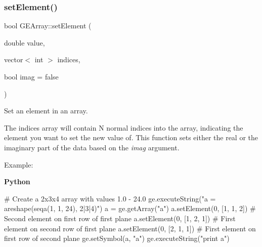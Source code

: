 \subsubsection{\texorpdfstring{set\+Element()}{setElement()}}
{\footnotesize\ttfamily bool G\+E\+Array\+::set\+Element (\begin{DoxyParamCaption}\item[{double}]{value,  }\item[{vector$<$ int $>$}]{indices,  }\item[{bool}]{imag = {\ttfamily false} }\end{DoxyParamCaption})}



Set an element in an array. 

The indices array will contain N normal indices into the array, indicating the element you want to set the new value of. This function sets either the real or the imaginary part of the data based on the {\itshape imag} argument.

Example\+:

{\bfseries Python} 
\begin{DoxyCode}
\textcolor{comment}{# Create a 2x3x4 array with values 1.0 - 24.0}
ge.executeString(\textcolor{stringliteral}{"a = areshape(seqa(1, 1, 24), 2|3|4)"})
a = ge.getArray(\textcolor{stringliteral}{"a"})
a.setElement(0, [1, 1, 2]) \textcolor{comment}{# Second element on first row of first plane}
a.setElement(0, [1, 2, 1]) \textcolor{comment}{# First element on second row of first plane}
a.setElement(0, [2, 1, 1]) \textcolor{comment}{# First element on first row of second plane}
ge.setSymbol(a, \textcolor{stringliteral}{"a"})
ge.executeString(\textcolor{stringliteral}{"print a"})
\end{DoxyCode}


